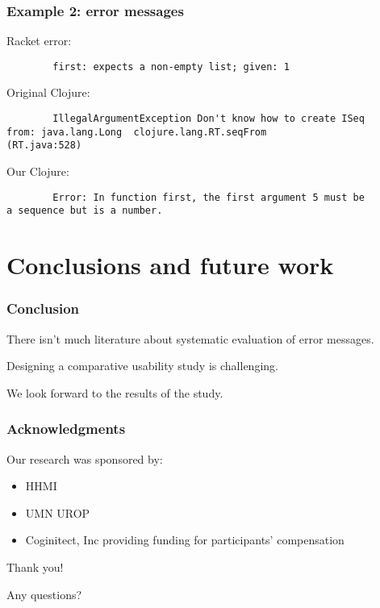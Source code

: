\documentclass{beamer}
\begin{document}
\begin{frame}[fragile]
\frametitle{Example 2: error messages}
Racket error:
\begin{verbatim}
		first: expects a non-empty list; given: 1	
\end{verbatim}

Original Clojure:
\begin{verbatim}
		IllegalArgumentException Don't know how to create ISeq  
from: java.lang.Long  clojure.lang.RT.seqFrom 
(RT.java:528)
\end{verbatim}

Our Clojure: 
\begin{verbatim}
		Error: In function first, the first argument 5 must be 
a sequence but is a number.
\end{verbatim}
\end{frame}

\section{Conclusions and future work} 

\begin{frame}
\frametitle{Conclusion}
There isn't much literature about systematic evaluation of error messages.

Designing a comparative usability study is challenging.

We look forward to the results of the study.  

\end{frame}

\begin{frame}
\frametitle{Acknowledgments}
	Our research was sponsored by:
	\begin{itemize}
	\item HHMI
	\item UMN UROP
          \item Coginitect, Inc providing funding for participants' compensation 
	\end{itemize}
	
	
	{\centering
	\noindent
	Thank you! \par
	Any questions? \par
	}
\end{frame}
\end{document}

